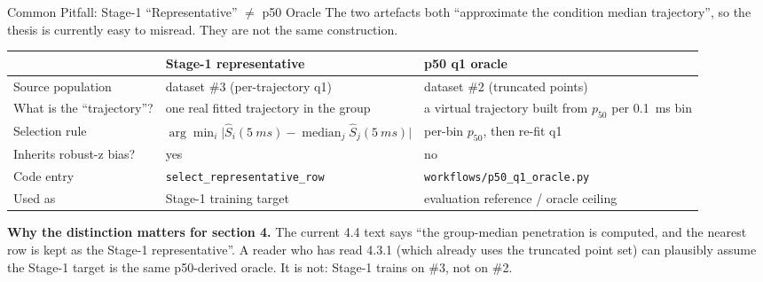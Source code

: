 \documentclass[UTF8,aspectratio=169]{ctexbeamer}
\newcommand{\good}[1]{\textcolor{green!45!black}{#1}}
\newcommand{\warn}[1]{\textcolor{red!65!black}{#1}}
\begin{document}
\begin{frame}{Common Pitfall: Stage-1 ``Representative'' \(\neq\) p50 Oracle}
\small
The two artefacts both ``approximate the condition median trajectory'', so the thesis is currently easy to misread. They are not the same construction.

\vspace{0.45em}
\begin{center}
\renewcommand{\arraystretch}{1.2}
\begin{tabular}{@{}L{3.7cm}L{5.4cm}L{5.4cm}@{}}
\toprule
& \textbf{Stage-1 representative} & \textbf{p50 q1 oracle} \\
\midrule
Source population & dataset \#3 (per-trajectory q1) & dataset \#2 (truncated points) \\
What is the ``trajectory''? & \warn{one real} fitted trajectory in the group & a \warn{virtual} trajectory built from \(p_{50}\) per \SI{0.1}{ms} bin \\
Selection rule & \(\arg\min_i \lvert\hat S_i(\SI{5}{ms}) - \operatorname{median}_j \hat S_j(\SI{5}{ms})\rvert\) & per-bin \(p_{50}\), then re-fit q1 \\
Inherits robust-z bias? & yes & \good{no} \\
Code entry & \texttt{select\_representative\_row} & \texttt{workflows/p50\_q1\_oracle.py} \\
Used as & Stage-1 training target & evaluation reference / oracle ceiling \\
\bottomrule
\end{tabular}
\end{center}

\vspace{0.45em}
\textbf{Why the distinction matters for section 4.}
The current 4.4 text says ``the group-median penetration is computed, and the nearest row is kept as the Stage-1 representative''. A reader who has read 4.3.1 (which already uses the truncated point set) can plausibly assume the Stage-1 target is the same p50-derived oracle. It is not: Stage-1 trains on \#3, not on \#2.
\end{frame}
\end{document}
